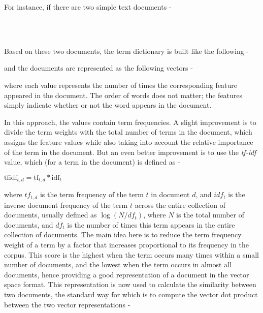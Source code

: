 For instance, if there are two simple text documents -

\begin{center}
    \\
    \\
\end{center}

Based on these two documents, the term dictionary is built like the following -


and the documents are represented as the following vectors -


where each value represents the number of times the corresponding feature appeared in the document. The order of words does not matter; the features simply indicate whether or not the word appears in the document.

In this approach, the values contain term frequencies. A slight improvement is to divide the term weights with the total number of terms in the document, which assigns the feature values while also taking into account the relative importance of the term in the document. But an even better improvement is to use the \emph{tf-idf} value, which (for a term in the document) is defined as -

\begin{center}
    $\mathrm{tfidf}_{t, d} = \mathrm{tf}_{t, d} * \mathrm{idf}_{t}$
\end{center}

where $tf_{t, d}$ is the term frequency of the term $t$ in document $d$, and $idf_{t}$ is the inverse document frequency of the term $t$ across the entire collection of documents, usually defined as $\log(N / df_{t})$, where $N$ is the total number of documents, and $df_{t}$ is the number of times this term appears in the entire collection of documents. The main idea here is to reduce the term frequency weight of a term by a factor that increases proportional to its frequency in the corpus. This score is the highest when the term occurs many times within a small number of documents, and the lowest when the term occurs in almost all documents, hence providing a good representation of a document in the vector space format. This representation is now used to calculate the similarity between two documents, the standard way for which is to compute the vector dot product between the two vector representations -

